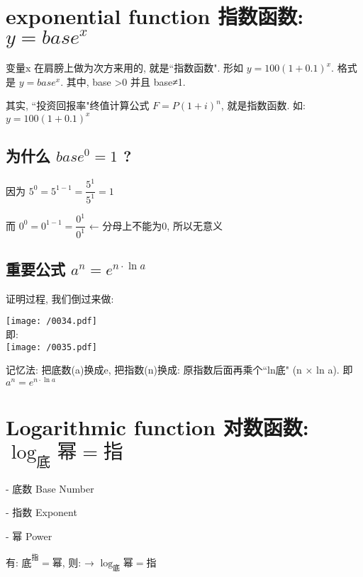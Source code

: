 \documentclass[UTF8]{ctexart}
\begin{document}
\section{exponential function 指数函数:  $ y=base^x $}

变量x 在肩膀上做为次方来用的, 就是``指数函数". 形如 $ y=100(1+0.1)^x $. 格式是   $ y=base^x $. 其中, base \textgreater 0 并且 base≠1.

其实, ``投资回报率"终值计算公式 $ F=P(1+i)^n $, 就是指数函数. 如: $ y=100(1+0.1)^x $ 


\subsection{为什么 $base^0=1$ ?}

因为 $ 5^0 =5^{1-1}=\dfrac{5^1} {5^1} =1$

而 $ 0^0 =0^{1-1}=\dfrac{0^1} {0^1} $ ← 分母上不能为0, 所以无意义





\subsection{重要公式 $ \boxed{a^n=e^{n\cdot \ln a}}$}

证明过程, 我们倒过来做: \\

\begin{myEnvSample}
\texttt{[image: /0034.pdf]} \\

即: \\
\texttt{[image: /0035.pdf]}
\end{myEnvSample}

记忆法: 把底数(a)换成e, 把指数(n)换成: 原指数后面再乘个``ln底" (n × ln a).  即 $a^n=e^{n\cdot \ln a}$




\section{Logarithmic function 对数函数:  $ \log _{\text{底}}\text{幂}=\text{指} $}

- 底数 Base Number

- 指数 Exponent

- 幂 Power

有: $\text{底}^{\text{指}}=\text{幂}$,  则: → $ \log _{\text{底}}\text{幂}=\text{指} $ \\
\end{document}
